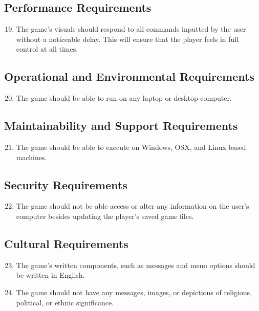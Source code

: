 \documentclass[12pt, titlepage]{article}
\begin{document}
\subsection{Performance Requirements}
\begin{enumerate}
\setcounter{enumi}{18}
	\item The game's visuals should respond to all commands inputted by the user without a noticeable delay. This will ensure that the player feels in full control at all times.
\end{enumerate}

\subsection{Operational and Environmental Requirements}
\begin{enumerate}
\setcounter{enumi}{19}
	\item The game should be able to run on any laptop or desktop computer.
\end{enumerate}

\subsection{Maintainability and Support Requirements}
\begin{enumerate}
\setcounter{enumi}{20}
	\item The game should be able to execute on Windows, OSX, and Linux based machines.
\end{enumerate}

\subsection{Security Requirements}
\begin{enumerate}
\setcounter{enumi}{21}
	\item The game should not be able access or alter any information on the user's computer besides updating the player's saved game files.
\end{enumerate}

\subsection{Cultural Requirements}
\begin{enumerate}
\setcounter{enumi}{22}
	\item The game's written components, such as messages and menu options should be written in English.
	\item The game should not have any messages, images, or depictions of religious, political, or ethnic significance.
\end{enumerate}
\end{document}
